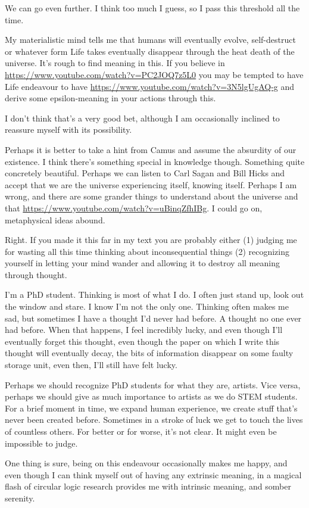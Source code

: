 We can go even further. I think too much I guess, so I pass this threshold all the time.

My materialistic mind tells me that humans will eventually evolve, self-destruct or whatever form Life takes eventually disappear through the heat death of the universe. It’s rough to find meaning in this. If you believe in \href{conformal cyclic cosmology}{https://www.youtube.com/watch?v=PC2JOQ7z5L0} you may be tempted to have Life endeavour to have \href{some kind of causal effect on the next universe}{https://www.youtube.com/watch?v=3N5lgUgAQ-g} and derive some epsilon-meaning in your actions through this.

I don’t think that’s a very good bet, although I am occasionally inclined to reassure myself with its possibility. 

Perhaps it is better to take a hint from Camus and assume the absurdity of our existence. I think there’s something special in knowledge though. Something quite concretely beautiful. Perhaps we can listen to Carl Sagan and Bill Hicks and accept that we are the universe experiencing itself, knowing itself. Perhaps I am wrong, and there are some grander things to understand about the universe and that \href{no one fucking knows yet}{https://www.youtube.com/watch?v=uBinqZfhIBg}. I could go on, metaphysical ideas abound.


Right. If you made it this far in my text you are probably either (1) judging me for wasting all this time thinking about inconsequential things (2) recognizing yourself in letting your mind wander and allowing it to destroy all meaning through thought.

I’m a PhD student. Thinking is most of what I do. I often just stand up, look out the window and stare. I know I’m not the only one. Thinking often makes me sad, but sometimes I have a thought I’d never had before. A thought no one ever had before. When that happens, I feel incredibly lucky, and even though I’ll eventually forget this thought, even though the paper on which I write this thought will eventually decay, the bits of information disappear on some faulty storage unit, even then, I’ll still have felt lucky.

Perhaps we should recognize PhD students for what they are, artists. Vice versa, perhaps we should give as much importance to artists as we do STEM students. For a brief moment in time, we expand human experience, we create stuff that’s never been created before. Sometimes in a stroke of luck we get to touch the lives of countless others. For better or for worse, it’s not clear. It might even be impossible to judge. 

One thing is sure, being on this endeavour occasionally makes me happy, and even though I can think myself out of having any extrinsic meaning, in a magical flash of circular logic research provides me with intrinsic meaning, and somber serenity.
